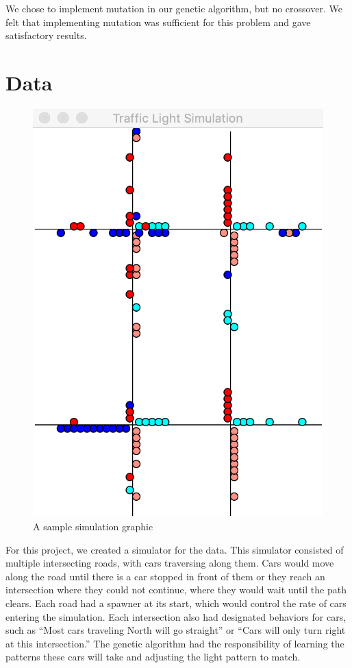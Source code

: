 \documentclass[12pt, letterpaper]{article}
\begin{document}
We chose to implement mutation in our genetic algorithm, but no crossover. 
We felt that implementing mutation was sufficient for this problem and gave satisfactory results.


\section*{Data}

\begin{figure}
\begin{center}
	\includegraphics[scale=0.5]{screenshot.png}
	\caption{A sample simulation graphic}
\end{center}
\end{figure}

For this project, we created a simulator for the data.
This simulator consisted of multiple intersecting roads, with cars traversing along them.
Cars would move along the road until there is a car stopped in front of them or they reach an intersection where they could not continue, where they would wait until the path clears.
Each road had a spawner at its start, which would control the rate of cars entering the simulation.
Each intersection also had designated behaviors for cars, such as ``Most cars traveling North will go straight'' or ``Cars will only turn right at this intersection.''
The genetic algorithm had the responsibility of learning the patterns these cars will take and adjusting the light pattern to match.
\end{document}
